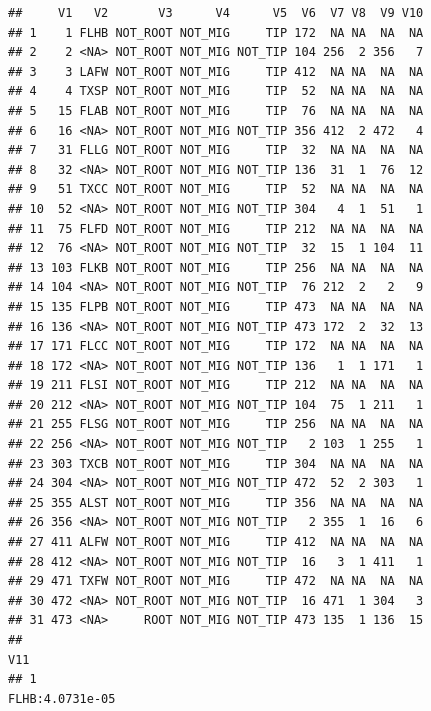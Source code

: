 \documentclass[]{article}
\begin{document}
\begin{verbatim}
##     V1   V2       V3      V4      V5  V6  V7 V8  V9 V10
## 1    1 FLHB NOT_ROOT NOT_MIG     TIP 172  NA NA  NA  NA
## 2    2 <NA> NOT_ROOT NOT_MIG NOT_TIP 104 256  2 356   7
## 3    3 LAFW NOT_ROOT NOT_MIG     TIP 412  NA NA  NA  NA
## 4    4 TXSP NOT_ROOT NOT_MIG     TIP  52  NA NA  NA  NA
## 5   15 FLAB NOT_ROOT NOT_MIG     TIP  76  NA NA  NA  NA
## 6   16 <NA> NOT_ROOT NOT_MIG NOT_TIP 356 412  2 472   4
## 7   31 FLLG NOT_ROOT NOT_MIG     TIP  32  NA NA  NA  NA
## 8   32 <NA> NOT_ROOT NOT_MIG NOT_TIP 136  31  1  76  12
## 9   51 TXCC NOT_ROOT NOT_MIG     TIP  52  NA NA  NA  NA
## 10  52 <NA> NOT_ROOT NOT_MIG NOT_TIP 304   4  1  51   1
## 11  75 FLFD NOT_ROOT NOT_MIG     TIP 212  NA NA  NA  NA
## 12  76 <NA> NOT_ROOT NOT_MIG NOT_TIP  32  15  1 104  11
## 13 103 FLKB NOT_ROOT NOT_MIG     TIP 256  NA NA  NA  NA
## 14 104 <NA> NOT_ROOT NOT_MIG NOT_TIP  76 212  2   2   9
## 15 135 FLPB NOT_ROOT NOT_MIG     TIP 473  NA NA  NA  NA
## 16 136 <NA> NOT_ROOT NOT_MIG NOT_TIP 473 172  2  32  13
## 17 171 FLCC NOT_ROOT NOT_MIG     TIP 172  NA NA  NA  NA
## 18 172 <NA> NOT_ROOT NOT_MIG NOT_TIP 136   1  1 171   1
## 19 211 FLSI NOT_ROOT NOT_MIG     TIP 212  NA NA  NA  NA
## 20 212 <NA> NOT_ROOT NOT_MIG NOT_TIP 104  75  1 211   1
## 21 255 FLSG NOT_ROOT NOT_MIG     TIP 256  NA NA  NA  NA
## 22 256 <NA> NOT_ROOT NOT_MIG NOT_TIP   2 103  1 255   1
## 23 303 TXCB NOT_ROOT NOT_MIG     TIP 304  NA NA  NA  NA
## 24 304 <NA> NOT_ROOT NOT_MIG NOT_TIP 472  52  2 303   1
## 25 355 ALST NOT_ROOT NOT_MIG     TIP 356  NA NA  NA  NA
## 26 356 <NA> NOT_ROOT NOT_MIG NOT_TIP   2 355  1  16   6
## 27 411 ALFW NOT_ROOT NOT_MIG     TIP 412  NA NA  NA  NA
## 28 412 <NA> NOT_ROOT NOT_MIG NOT_TIP  16   3  1 411   1
## 29 471 TXFW NOT_ROOT NOT_MIG     TIP 472  NA NA  NA  NA
## 30 472 <NA> NOT_ROOT NOT_MIG NOT_TIP  16 471  1 304   3
## 31 473 <NA>     ROOT NOT_MIG NOT_TIP 473 135  1 136  15
##                                                                                                                                                                                                                                                                                                                                                                                                                                 V11
## 1                                                                                                                                                                                                                                                                                                                                                                                                                   FLHB:4.0731e-05

\end{verbatim}
\end{document}
